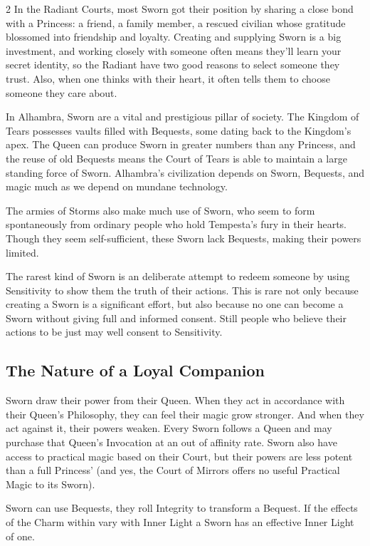 \begin{multicols}{2}
In the Radiant Courts, most Sworn got their position by sharing a close bond with a Princess: a friend, a family member, a rescued civilian whose gratitude blossomed into friendship and loyalty. Creating and supplying Sworn is a big investment, and working closely with someone often means they'll learn your secret identity, so the Radiant have two good reasons to select someone they trust. Also, when one thinks with their heart, it often tells them to choose someone they care about. 

In Alhambra, Sworn are a vital and prestigious pillar of society. The Kingdom of Tears possesses vaults filled with Bequests, some dating back to the Kingdom's apex. The Queen can produce Sworn in greater numbers than any Princess, and the reuse of old Bequests means the Court of Tears is able to maintain a large standing force of Sworn. Alhambra's civilization depends on Sworn, Bequests, and magic much as we depend on mundane technology.

The armies of Storms also make much use of Sworn, who seem to form spontaneously from ordinary people who hold Tempesta’s fury in their hearts. Though they seem self-sufficient, these Sworn lack Bequests, making their powers limited.

The rarest kind of Sworn is an deliberate attempt to redeem someone by using Sensitivity to show them the truth of their actions. This is rare not only because creating a Sworn is a significant effort, but also because no one can become a Sworn without giving full and informed consent. Still people who believe their actions to be just may well consent to Sensitivity.

\subsection*{The Nature of a Loyal Companion}

Sworn draw their power from their Queen. When they act in accordance with their Queen's Philosophy, they can feel their magic grow stronger. And when they act against it, their powers weaken. Every Sworn follows a Queen and may purchase that Queen's Invocation at an out of affinity rate. Sworn also have access to practical magic based on their Court, but their powers are less potent than a full Princess' (and yes, the Court of Mirrors offers no useful Practical Magic to its Sworn).

Sworn can use Bequests, they roll Integrity to transform a Bequest. If the effects of the Charm within vary with Inner Light a Sworn has an effective Inner Light of one. 


\end{multicols}
